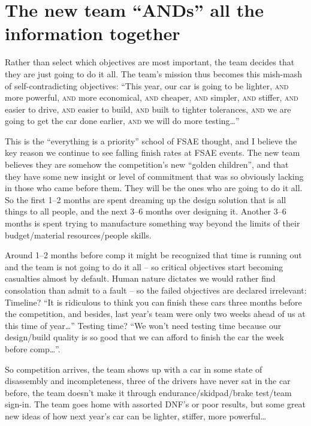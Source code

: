 \documentclass[10pt, a4paper, article, oneside, twocolumn, final]{memoir}
\begin{document}
\section*{The new team “ANDs” all the information together}

Rather than select which objectives are most important, the team decides that they are just going to do it all. The team’s mission thus becomes this mish-mash of self-contradicting objectives: “This year, our car is going to be lighter, \textsc{and} more powerful, \textsc{and} more economical, \textsc{and} cheaper, \textsc{and} simpler, \textsc{and} stiffer, \textsc{and} easier to drive, \textsc{and} easier to build, \textsc{and} built to tighter tolerances, \textsc{and} we are going to get the car done earlier, \textsc{and} we will do more testing\ldots” 

This is the “everything is a priority” school of FSAE thought, and I believe the key reason we continue to see falling finish rates at FSAE events. The new team believes they are somehow the competition’s new “golden children”, and that they have some new insight or level of commitment that was so obviously lacking in those who came before them. They will be the ones who are going to do it all. So the first \numrange{1}{2} months are spent dreaming up the design solution that is all things to all people, and the next \numrange{3}{6} months over designing it. Another \numrange{3}{6} months is spent trying to manufacture something way beyond the limits of their budget/\allowbreak material resources/\allowbreak people skills. 

Around \numrange{1}{2} months before comp it might be recognized that time is running out and the team is not going to do it all -- so critical objectives start becoming casualties almost by default. Human nature dictates we would rather find consolation than admit to a fault -- so the failed objectives are declared irrelevant: Timeline? “It is ridiculous to think you can finish these cars three months before the competition, and besides, last year’s team were only two weeks ahead of us at this time of year\ldots” Testing time? “We won’t need testing time because our design/\allowbreak build quality is so good that we can afford to finish the car the week before comp\ldots”. 

So competition arrives, the team shows up with a car in some state of disassembly and incompleteness, three of the drivers have never sat in the car before, the team doesn't make it through endurance/\allowbreak skidpad/\allowbreak brake test/\allowbreak team sign-in. The team goes home with assorted DNF's or poor results, but some great new ideas of how next year’s car can be lighter, stiffer, more powerful\ldots 
\end{document}
